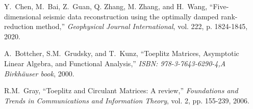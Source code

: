 \begin{thebibliography}{00}
Y.~Chen, M.~Bai, Z.~Guan, Q. Zhang, M. Zhang, and H.~Wang, ``Five-dimensional seismic data reconstruction using the optimally damped rank-reduction method,''
  \emph{Geophysical Journal International}, vol. 222, p. 1824-1845, 2020.
  
A.~Bottcher, S.M.~Grudsky, and T.~Kunz, ``Toeplitz Matrices, Asymptotic Linear Algebra, and Functional Analysis,''
  \emph{ISBN: 978-3-7643-6290-4,A Birkhäuser book}, 2000.
  
R.M.~Gray, ``Toeplitz and Circulant Matrices: A review,''
  \emph{Foundations and Trends in Communications and Information Theory}, vol. 2, pp. 155-239, 2006.



\end{thebibliography}

